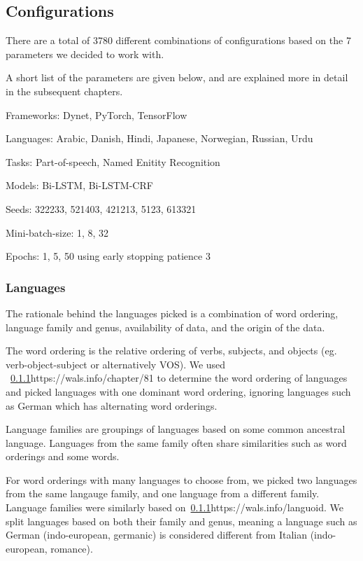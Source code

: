 
\subsection{Configurations}

There are a total of 3780 different combinations of configurations based on the
7 parameters we decided to work with. 

A short list of the parameters are given below, and are explained more in detail
in the subsequent chapters.

Frameworks: Dynet, PyTorch, TensorFlow

Languages: Arabic, Danish, Hindi, Japanese, Norwegian, Russian, Urdu

Tasks: Part-of-speech, Named Enitity Recognition

Models: Bi-LSTM, Bi-LSTM-CRF

Seeds: 322233, 521403, 421213, 5123, 613321

Mini-batch-size: 1, 8, 32

Epochs: 1, 5, 50 using early stopping patience 3


\subsubsection{Languages}

The rationale behind the languages picked is a combination of word ordering,
language family and genus, availability of data, and the origin of the data.

The word ordering is the relative ordering of verbs, subjects, and objects (eg.
verb-object-subject or alternatively VOS). We used
~\ref{}{https://wals.info/chapter/81} to determine the word ordering of
languages and picked languages with one dominant word ordering, ignoring
languages such as German which has alternating word orderings. 

Language families are groupings of languages based on some common ancestral
language. Languages from the same family often share similarities such as word
orderings and some words. 

For word orderings with many languages to choose from, we picked two languages
from the same langauge family, and one language from a different family.
Language families were similarly based on~\ref{}{https://wals.info/languoid}. We
split languages based on both their family and genus, meaning a language such as
German (indo-european, germanic) is considered different from Italian
(indo-european, romance).

